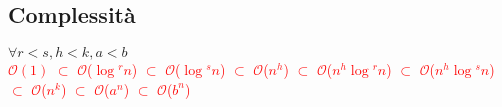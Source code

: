 \documentclass[../cheatSheetAlgoritmi.tex]{subfiles}
\begin{document}
\subsection{Complessità}
$\forall r < s, h < k, a < b$\\
\textcolor{red}{$\mathcal{O}(1)$ $\subset$ $\mathcal{O}$($\log$$^{r}n$) $\subset$ $\mathcal{O}$($\log$$^{s}n$) $\subset$ $\mathcal{O}$($n^{h}$) $\subset$ $\mathcal{O}$($n^{h}$$\log$$^{r}n$)  $\subset$ $\mathcal{O}$($n^{h}$$\log$$^{s}n$) $\subset$ $\mathcal{O}$($n^{k}$) $\subset$ $\mathcal{O}$($a^{n}$) $\subset$ $\mathcal{O}$($b^{n}$)}
\newpage
\end{document}
